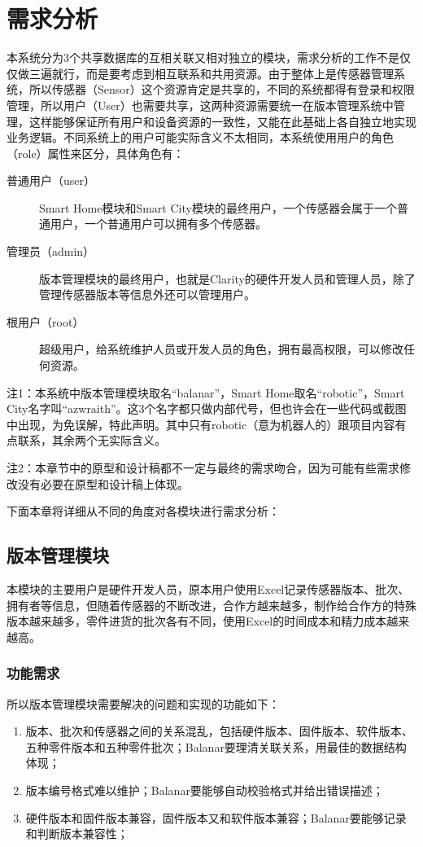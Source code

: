 
\chapter{需求分析}
\label{chap:requirement}
本系统分为3个共享数据库的互相关联又相对独立的模块，需求分析的工作不是仅仅做三遍就行，而是要考虑到相互联系和共用资源。由于整体上是传感器管理系统，所以传感器（Sensor）这个资源肯定是共享的，不同的系统都得有登录和权限管理，所以用户（User）也需要共享，这两种资源需要统一在版本管理系统中管理，这样能够保证所有用户和设备资源的一致性，又能在此基础上各自独立地实现业务逻辑。不同系统上的用户可能实际含义不太相同，本系统使用用户的角色（role）属性来区分，具体角色有：
\begin{description}
  \item[普通用户（user）] Smart Home模块和Smart City模块的最终用户，一个传感器会属于一个普通用户，一个普通用户可以拥有多个传感器。
  \item[管理员（admin）] 版本管理模块的最终用户，也就是Clarity的硬件开发人员和管理人员，除了管理传感器版本等信息外还可以管理用户。
  \item[根用户（root）] 超级用户，给系统维护人员或开发人员的角色，拥有最高权限，可以修改任何资源。
\end{description}

注1：本系统中版本管理模块取名“balanar”，Smart Home取名“robotic”，Smart City名字叫“azwraith”。这3个名字都只做内部代号，但也许会在一些代码或截图中出现，为免误解，特此声明。其中只有robotic（意为机器人的）跟项目内容有点联系，其余两个无实际含义。

注2：本章节中的原型和设计稿都不一定与最终的需求吻合，因为可能有些需求修改没有必要在原型和设计稿上体现。

下面本章将详细从不同的角度对各模块进行需求分析：
\section{版本管理模块}
本模块的主要用户是硬件开发人员，原本用户使用Excel记录传感器版本、批次、拥有者等信息，但随着传感器的不断改进，合作方越来越多，制作给合作方的特殊版本越来越多，零件进货的批次各有不同，使用Excel的时间成本和精力成本越来越高。
\subsection{功能需求}
所以版本管理模块需要解决的问题和实现的功能如下：
\begin{enumerate}
  \item 版本、批次和传感器之间的关系混乱，包括硬件版本、固件版本、软件版本、五种零件版本和五种零件批次；Balanar要理清关联关系，用最佳的数据结构体现；
  \item 版本编号格式难以维护；Balanar要能够自动校验格式并给出错误描述；
  \item 硬件版本和固件版本兼容，固件版本又和软件版本兼容；Balanar要能够记录和判断版本兼容性；
\end{enumerate}
